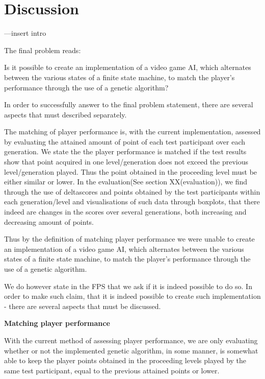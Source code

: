 \section{Discussion} \label{sec:discussion}

---insert intro


The final problem reads:

Is it possible to create an implementation of a video game AI, which alternates between the various states of a finite state machine, to match the player's performance through the use of a genetic algorithm?



In order to successfully answer to the final problem statement, there are several aspects that must described separately.

The matching of player performance is, with the current implementation, assessed by evaluating the attained amount of point of each test participant over each generation. We state the the player performance is matched if the test results show that point acquired in one level/generation does not exceed the previous level/generation played. Thus the point obtained in the proceeding level must be either similar or lower.
In the evaluation(See section XX(evaluation)), we find through the use of deltascores and points obtained by the test participants within each generation/level and visualisations of such data through boxplots, that there indeed are changes in the scores over several generations, both increasing and decreasing amount of points.

Thus by the definition of matching player performance we were unable to create an implementation of a video game AI, which alternates between the various states of a finite state machine, to match the player's performance through the use of a genetic algorithm.

We do however state in the FPS that we ask if it is indeed possible to do so. In order to make such claim, that it is indeed possible to create such implementation - there are several aspects that must be discussed.

\textbf{Matching player performance}

With the current method of assessing player performance, we are only evaluating whether or not the implemented genetic algorithm, in some manner, is somewhat able to keep the player points obtained in the proceeding levels played by the same test participant, equal to the previous attained points or lower.


